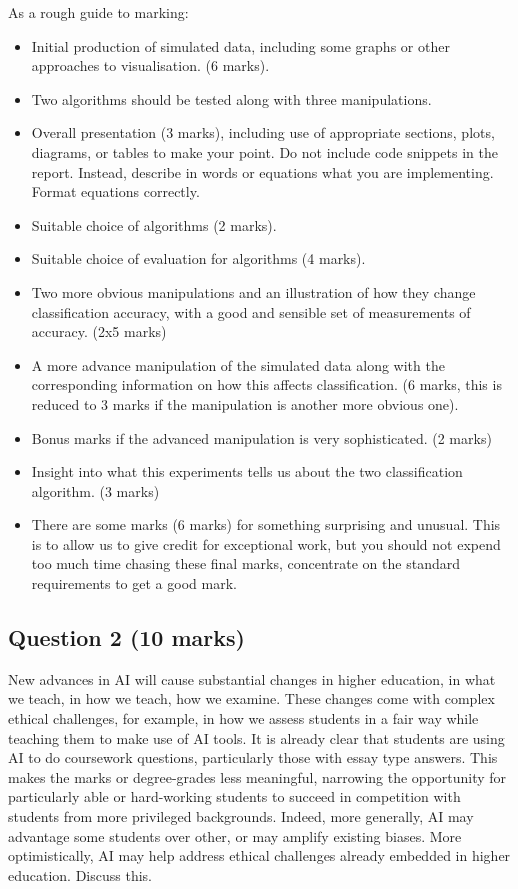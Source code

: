 \documentclass[12pt]{article}
\begin{document}
As a rough guide to marking:
\begin{itemize}
\item Initial production of simulated data, including some graphs or other approaches to visualisation. (6 marks).
\item Two algorithms should be tested along with three manipulations.
\item Overall presentation (3 marks), including use of appropriate
  sections, plots, diagrams, or tables to make your point. Do not
  include code snippets in the report. Instead, describe in words or
  equations what you are implementing. Format equations correctly.
\item Suitable choice of algorithms (2 marks).
\item Suitable choice of evaluation for algorithms (4 marks).
\item Two more obvious manipulations and an illustration of how they change classification accuracy, with a good and sensible set of measurements of accuracy. (2x5 marks)
\item A more advance manipulation of the simulated data along with the corresponding information on how this affects classification. (6 marks, this is reduced to 3 marks if the manipulation is another more obvious one).
\item Bonus marks if the advanced manipulation is very sophisticated. (2 marks)
\item Insight into what this experiments tells us about the two classification algorithm. (3 marks)
\item There are some marks (6 marks) for something surprising and
  unusual. This is to allow us to give credit for exceptional work,
  but you should not expend too much time chasing these final marks,
  concentrate on the standard requirements to get a good mark.
\end{itemize}

\subsection*{Question 2 (10 marks)}

New advances in AI will cause substantial changes in higher education,
in what we teach, in how we teach, how we examine. These changes come
with complex ethical challenges, for example, in how we assess
students in a fair way while teaching them to make use of AI tools. It
is already clear that students are using AI to do coursework
questions, particularly those with essay type answers. This makes the
marks or degree-grades less meaningful, narrowing the opportunity for
particularly able or hard-working students to succeed in competition
with students from more privileged backgrounds. Indeed, more
generally, AI may advantage some students over other, or may amplify
existing biases. More optimistically, AI may help address ethical
challenges already embedded in higher education. Discuss this.
\end{document}
